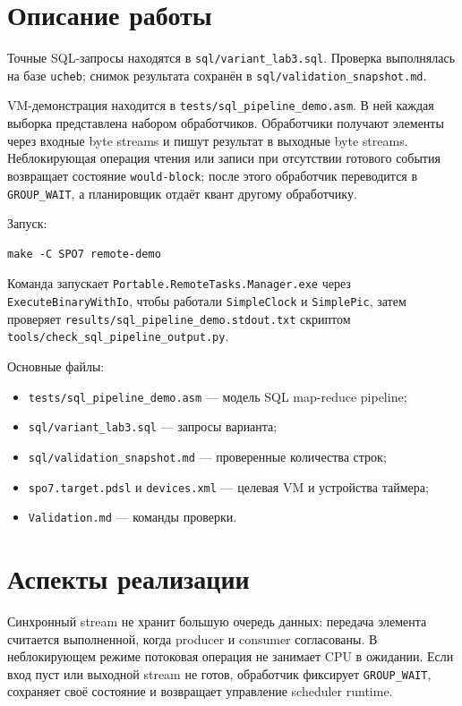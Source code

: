 \documentclass[a4paper,12pt]{article}
\begin{document}
\section{Описание работы}
Точные SQL-запросы находятся в \texttt{sql/variant\_lab3.sql}. Проверка выполнялась на базе \texttt{ucheb}; снимок результата сохранён в \texttt{sql/validation\_snapshot.md}.

VM-демонстрация находится в \texttt{tests/sql\_pipeline\_demo.asm}. В ней каждая выборка представлена набором обработчиков. Обработчики получают элементы через входные byte streams и пишут результат в выходные byte streams. Неблокирующая операция чтения или записи при отсутствии готового события возвращает состояние \texttt{would-block}; после этого обработчик переводится в \texttt{GROUP\_WAIT}, а планировщик отдаёт квант другому обработчику.

Запуск:
\begin{lstlisting}
make -C SPO7 remote-demo
\end{lstlisting}

Команда запускает \texttt{Portable.RemoteTasks.Manager.exe} через \texttt{ExecuteBinaryWithIo}, чтобы работали \texttt{SimpleClock} и \texttt{SimplePic}, затем проверяет \texttt{results/sql\_pipeline\_demo.stdout.txt} скриптом \texttt{tools/check\_sql\_pipeline\_output.py}.

Основные файлы:
\begin{itemize}
\item \texttt{tests/sql\_pipeline\_demo.asm} — модель SQL map-reduce pipeline;
\item \texttt{sql/variant\_lab3.sql} — запросы варианта;
\item \texttt{sql/validation\_snapshot.md} — проверенные количества строк;
\item \texttt{spo7.target.pdsl} и \texttt{devices.xml} — целевая VM и устройства таймера;
\item \texttt{Validation.md} — команды проверки.
\end{itemize}

\section{Аспекты реализации}
Синхронный stream не хранит большую очередь данных: передача элемента считается выполненной, когда producer и consumer согласованы. В неблокирующем режиме потоковая операция не занимает CPU в ожидании. Если вход пуст или выходной stream не готов, обработчик фиксирует \texttt{GROUP\_WAIT}, сохраняет своё состояние и возвращает управление scheduler runtime.
\end{document}
